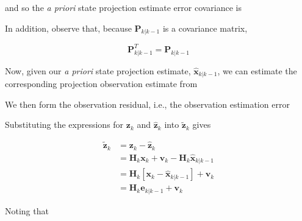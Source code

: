 \documentclass[12pt]{article}
\begin{document}
and so the \textit{a priori} state projection estimate error covariance is


In addition, observe that, because $\mathbf{P}_{k|k-1}$ is a covariance matrix,

\begin{equation*}
    \mathbf{P}_{k|k-1}^T = \mathbf{P}_{k|k-1}
\end{equation*}

Now, given our \textit{a priori} state projection estimate, $\hat{\mathbf{x}}_{k|k-1}$,
we can estimate the corresponding projection observation estimate from


We then form the observation residual, i.e., the observation estimation error


Substituting the expressions for $\mathbf{z}_k$ and $\hat{\mathbf{z}}_k$ into $\tilde{\mathbf{z}}_k$ gives

\begin{equation*}
    \begin{aligned}
        \tilde{\mathbf{z}}_k &= \mathbf{z}_k - \hat{\mathbf{z}}_k \\
        &= \mathbf{H}_k \mathbf{x}_k + \mathbf{v}_k - \mathbf{H}_k \hat{\mathbf{x}}_{k|k-1} \\
        &= \mathbf{H}_k \left[ \mathbf{x}_k - \hat{\mathbf{x}}_{k|k-1} \right] + \mathbf{v}_k \\
        &= \mathbf{H}_k \mathbf{e}_{k|k-1} + \mathbf{v}_k
    \end{aligned}
\end{equation*}

Noting that
\end{document}
